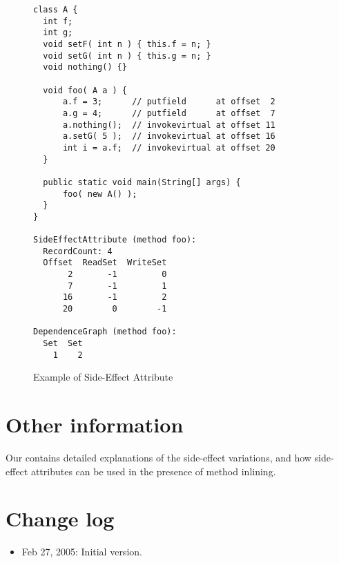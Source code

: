 \documentclass{article}
\begin{document}
\begin{figure}[htbp]
\centering
\begin{minipage}{130mm}
\begin{Verbatim}
class A {
  int f;
  int g;
  void setF( int n ) { this.f = n; }
  void setG( int n ) { this.g = n; }
  void nothing() {}

  void foo( A a ) {
      a.f = 3;      // putfield      at offset  2
      a.g = 4;      // putfield      at offset  7
      a.nothing();  // invokevirtual at offset 11
      a.setG( 5 );  // invokevirtual at offset 16 
      int i = a.f;  // invokevirtual at offset 20
  }

  public static void main(String[] args) {
      foo( new A() );
  }
}

SideEffectAttribute (method foo): 
  RecordCount: 4
  Offset  ReadSet  WriteSet
       2       -1         0
       7       -1         1
      16       -1         2
      20        0        -1

DependenceGraph (method foo):
  Set  Set
    1    2
\end{Verbatim}
\end{minipage}
\caption{Example of Side-Effect Attribute\label{FIG:SEEXAMPLE}}
\end{figure}

          
\section*{Other information}
Our 
contains detailed explanations of the side-effect variations, and how
side-effect attributes can be used in the presence of method inlining.

\section*{Change log}
\begin{itemize}
\item Feb 27, 2005: Initial version.
\end{itemize}
\end{document}
